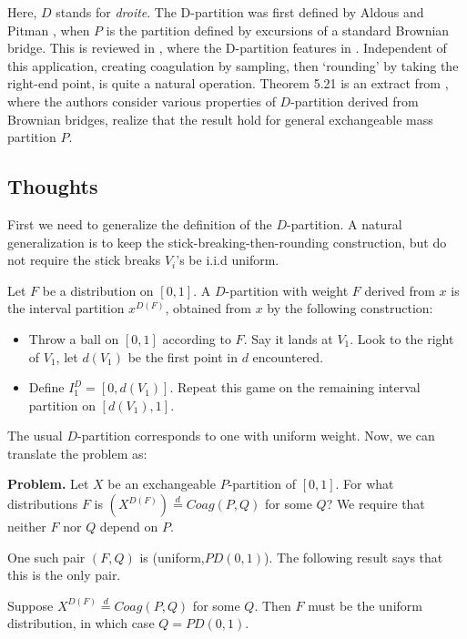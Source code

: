 Here, $D$ stands for \emph{droite}.
The D-partition was first defined by Aldous and Pitman \cite{MR1293075}, when $P$ is the partition defined by excursions of a standard Brownian bridge. This is reviewed in \cite[\S 9]{MR2245368}, where the D-partition features in \cite[Theorem 9.6]{MR2245368}. Independent of this application, creating coagulation by sampling, then `rounding' by taking the right-end point, is quite a natural operation. 
Theorem 5.21 is an extract from \cite[Theorem 23]{MR2276901}, where the authors consider various properties of $D$-partition derived from Brownian bridges, realize that the result hold for general exchangeable mass partition $P$. 

\subsection{Thoughts} %

First we need to generalize the definition of the $D$-partition. A natural generalization is to keep the stick-breaking-then-rounding construction, but do not require the stick breaks $V_i$'s be i.i.d uniform. 

\begin{definition}
Let $F$ be a distribution on $[0,1]$. A $D$-partition with weight $F$ derived from $x$ is the interval partition $x^{D(F)}$, obtained from $x$ by the following construction: 
\begin{itemize}
  \item Throw a ball on $[0,1]$ according to $F$. Say it lands at $V_1$. Look to the right of $V_1$, let $d(V_1)$ be the first point in $d$ encountered. 
  \item Define $I^D_1 = [0,d(V_1)]$. Repeat this game on the remaining interval partition on $[d(V_1), 1]$. 
\end{itemize}
\end{definition}
The usual $D$-partition corresponds to one with uniform weight. Now, we can translate the problem as:

\textbf{Problem.} Let $X$ be an exchangeable $P$-partition of $[0,1]$. For what distributions $F$ is $(X^{D(F)}) \stackrel{d}{=} Coag(P, Q)$ for some $Q$? We require that neither $F$ nor $Q$ depend on $P$. 

One such pair $(F,Q)$ is (uniform,$PD(0,1)$). The following result says that this is the only pair.

\begin{theorem}\label{thm:543}
Suppose $X^{D(F)} \stackrel{d}{=} Coag(P, Q)$ for some $Q$. Then $F$ must be the uniform distribution, in which case $Q = PD(0,1)$. 
\end{theorem}

